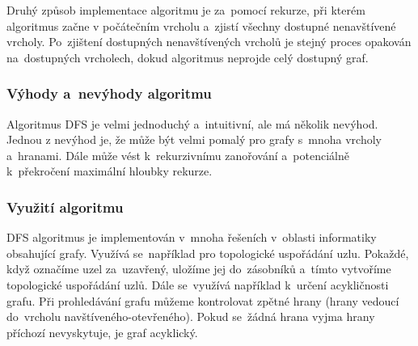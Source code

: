 \documentclass[12pt, titlepage, a4paper]{article}
\begin{document}
Druhý způsob implementace algoritmu je za~pomocí rekurze, při kterém algoritmus začne v 
počátečním vrcholu a~zjistí všechny dostupné nenavštívené vrcholy. Po~zjištení dostupných 
nenavštívených vrcholů je stejný proces opakován na~dostupných vrcholech, dokud algoritmus 
neprojde celý dostupný graf.
~\cite{GeeksforGeeks: DFS,Khan Academy: DFS}

\subsubsection{Výhody a~nevýhody algoritmu}
Algoritmus DFS je velmi jednoduchý a~intuitivní, ale má několik nevýhod. Jednou z 
nevýhod je, že může být velmi pomalý pro grafy s~mnoha vrcholy a~hranami. Dále může 
vést k~rekurzivnímu zanořování a~potenciálně k~překročení maximální hloubky rekurze.


\subsubsection{Využití algoritmu}
DFS algoritmus je implementován v~mnoha řešeních v~oblasti informatiky obsahující grafy. 
Využívá se~například pro topologické uspořádání uzlu. Pokaždé, když označíme uzel za~uzavřený, 
uložíme jej do~zásobníků a~tímto vytvoříme topologické uspořádání uzlů.
Dále se~využívá například k~určení acykličnosti grafu. Při prohledávání grafu můžeme kontrolovat zpětné hrany (hrany 
vedoucí do~vrcholu navštíveného-otevřeného). Pokud se~žádná hrana vyjma hrany příchozí 
nevyskytuje, je graf acyklický.

\newpage
\end{document}

